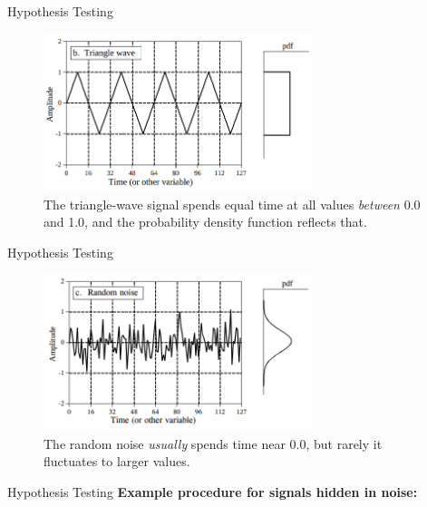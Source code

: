 \documentclass{beamer}
\begin{document}
\begin{frame}[fragile]{Hypothesis Testing}
\begin{figure}
\centering
\includegraphics[width=0.7\textwidth]{figures/trianglepdf.png}
\caption{\label{fig:trianglepdf} The triangle-wave signal spends equal time at all values \textit{between} 0.0 and 1.0, and the probability density function reflects that.}
\end{figure}
\end{frame}

\begin{frame}[fragile]{Hypothesis Testing}
\begin{figure}
\centering
\includegraphics[width=0.7\textwidth]{figures/randnpdf.png}
\caption{\label{fig:randnpdf} The random noise \textit{usually} spends time near 0.0, but rarely it fluctuates to larger values.}
\end{figure}
\end{frame}

\begin{frame}{Hypothesis Testing}
\textbf{Example procedure for signals hidden in noise:} \\ \vspace{5cm}
\end{frame}
\end{document}
